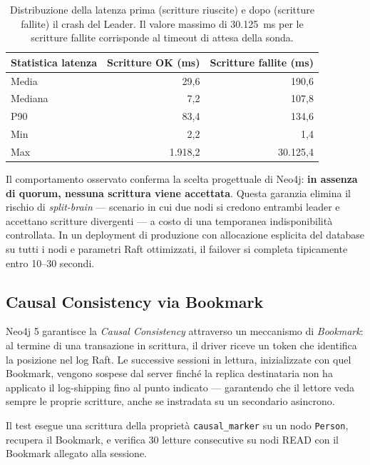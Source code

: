 \begin{table}[hbt!]
  \centering
  \begin{tabular}{lrr}
    \hline
    \textbf{Statistica latenza} & \textbf{Scritture OK (ms)} & \textbf{Scritture fallite (ms)} \\
    \hline
    Media   & 29,6  & 190,6  \\
    Mediana & 7,2   & 107,8  \\
    P90     & 83,4  & 134,6  \\
    Min     & 2,2   & 1,4    \\
    Max     & 1.918,2 & 30.125,4 \\
    \hline
  \end{tabular}
  \caption{Distribuzione della latenza prima (scritture riuscite) e dopo (scritture fallite) il crash del Leader. Il valore massimo di 30.125~ms per le scritture fallite corrisponde al timeout di attesa della sonda.}
  \label{tab:fault_latency}
\end{table}

Il comportamento osservato conferma la scelta progettuale di Neo4j: \textbf{in assenza di quorum, nessuna scrittura viene accettata}. Questa garanzia elimina il rischio di \textit{split-brain} — scenario in cui due nodi si credono entrambi leader e accettano scritture divergenti — a costo di una temporanea indisponibilità controllata. In un deployment di produzione con allocazione esplicita del database su tutti i nodi e parametri Raft ottimizzati, il failover si completa tipicamente entro 10–30 secondi.

\subsection{Causal Consistency via Bookmark}
Neo4j 5 garantisce la \textit{Causal Consistency} attraverso un meccanismo di \textit{Bookmark}: al termine di una transazione in scrittura, il driver riceve un token che identifica la posizione nel log Raft. Le successive sessioni in lettura, inizializzate con quel Bookmark, vengono sospese dal server finché la replica destinataria non ha applicato il log-shipping fino al punto indicato — garantendo che il lettore veda sempre le proprie scritture, anche se instradata su un secondario asincrono.

Il test esegue una scrittura della proprietà \texttt{causal\_marker} su un nodo \texttt{Person}, recupera il Bookmark, e verifica 30 letture consecutive su nodi READ con il Bookmark allegato alla sessione.

